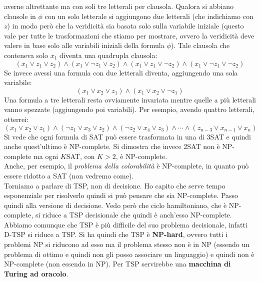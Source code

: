 averne altrettante ma con soli tre letterali per clausola. Qualora si abbiano
clausole in $\phi$ con un solo letterale si aggiungono due letterali (che
indichiamo con $z$) in modo
però che la veridicità sia basata solo sulla variabile iniziale (questo vale per
tutte le trasformazioni che stiamo per mostrare, ovvero la veridicità deve
valere in base solo alle variabili iniziali della formula $\phi$). Tale clausola
che conteneva solo $x_1$ diventa una quadrupla clausola:
\[(x_1\lor z_1\lor z_2)\land (x_1\lor\neg z_1\lor z_2)\land (x_1\lor z_1\lor\neg
  z_2)\land(x_1\lor\neg z_1\lor\neg z_2)\] 
Se invece avessi una formula con due letterali diventa, aggiungendo una sola
variabile: 
\[(x_1\lor x_2\lor z_1)\land (x_1\lor x_2\lor \neg z_1)\]
Una formula a tre letterali resta ovviamente invariata mentre quelle a più
letterali vanno spezzate (aggiungendo poi variabili). Per esempio, avendo
quattro letterali, otterrei:
\[(x_1\lor x_2\lor z_1)\land (\neg z_1\lor x_3\lor z_2)\land (\neg z_2\lor
  x_4\lor z_3)\land\cdots\land(z_{n-3}\lor x_{n-1}\lor x_n)\]
Si vede che ogni formula di SAT può essere trasformata in una di 3SAT e quindi
anche quest'ultimo è NP-complete. Si dimostra che invece 2SAT non è NP-complete
ma ogni $K$SAT, con $K>2$, è NP-complete.\\
Anche, per esempio, il \textit{problema della colorabilità} è NP-complete, in
quanto può essere ridotto a SAT (non vedremo come).\\
Torniamo a parlare di TSP, non di decisione. Ho capito che serve tempo
esponenziale per risolverlo quindi si può pensare che sia NP-complete. Passo
quindi alla versione di decisione. Vedo però che ciclo
hamiltoniano, che è NP-complete, si riduce a TSP decisionale che quindi è
anch'esso NP-complete. Abbiamo comunque che TSP è più difficile del suo problema
decisionale, infatti D-TSP si riduce a TSP. Si ha quindi che TSP è
\textbf{NP-hard}, ovvero tutti i problemi NP si riducono ad esso ma il problema
stesso non è in NP (essendo un problema di ottimo e quindi non gli posso
associare un linguaggio) e quindi non è NP-complete (non essendo in NP). Per
TSP servirebbe una \textbf{macchina di Turing ad oracolo}.
